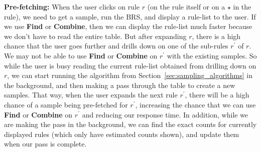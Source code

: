{\smallskip
\noindent \textbf{Pre-fetching:} When the user clicks on rule $r$ (on the rule itself or on a $\star$ in the rule), we need to get a sample, run the BRS, and display a rule-list to the user. If we use \textbf{Find} or \textbf{Combine}, then we can display the rule-list much faster because we don't have to read the entire table. But after expanding $r$, there is a high chance that the user goes further and drills down on one of the sub-rules $r^{\prime}$ of $r$. We may not be able to use \textbf{Find} or \textbf{Combine} on $r^{\prime}$ with the existing samples. So while the user is busy reading the current rule-list obtained from drilling down on $r$, we can start running the algorithm from Section~\ref{sec:sampling_algorithms} in the background, and then making a pass through the table to create a new samples. That way, when the user expands the next rule $r^{\prime}$, there will be a high chance of a sample being pre-fetched for $r^{\prime}$, increasing the chance that we can use \textbf{Find} or \textbf{Combine} on $r^{\prime}$ and reducing our response time.
In addition, while we are making the pass in the background, we can find the exact counts for currently displayed rules (which only have estimated counts shown), and update them when our pass is complete.
}
